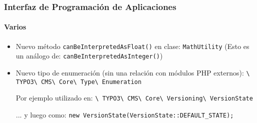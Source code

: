 \begin{frame}[fragile]
	\frametitle{Interfaz de Programación de Aplicaciones}
	\framesubtitle{Varios}

	\begin{itemize}
		\item Nuevo método \texttt{canBeInterpretedAsFloat()} en clase: \texttt{MathUtility}\newline
			\small(Esto es un análogo de: \texttt{canBeInterpretedAsInteger()})\normalsize
		\item Nuevo tipo de enumeración (sin una relación con módulos PHP externos):\newline
			\texttt{\textbackslash
				TYPO3\textbackslash
				CMS\textbackslash
				Core\textbackslash
				Type\textbackslash
				Enumeration}\newline

			Por ejemplo utilizado en:\newline
			\texttt{\textbackslash
				TYPO3\textbackslash
				CMS\textbackslash
				Core\textbackslash
				Versioning\textbackslash
				VersionState}\newline

			... y luego como:\newline
			\texttt{new VersionState(VersionState::DEFAULT\_STATE);}

	\end{itemize}

\end{frame}


